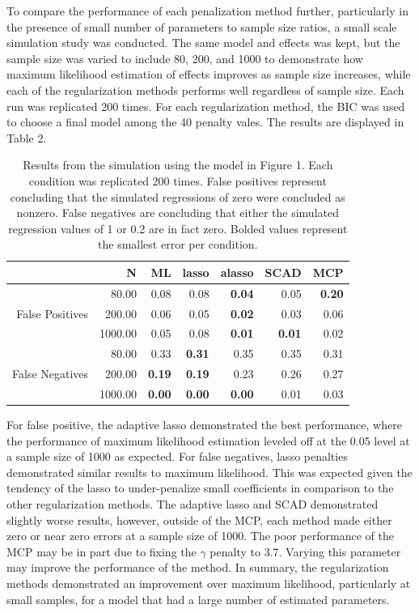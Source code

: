 \documentclass[article]{jss}
\begin{document}
To compare the performance of each penalization method further,
particularly in the presence of small number of parameters to sample
size ratios, a small scale simulation study was conducted. The same
model and effects was kept, but the sample size was varied to include
80, 200, and 1000 to demonstrate how maximum likelihood estimation of
effects improves as sample size increases, while each of the
regularization methods performs well regardless of sample size. Each run
was replicated 200 times. For each regularization method, the BIC was
used to choose a final model among the 40 penalty vales. The results are
displayed in Table 2.

\begin{table}[ht]
\centering
\begin{tabular}{rrrrrrr}
  \hline
 & N & ML & lasso & alasso & SCAD & MCP \\ 
  \hline
 & 80.00 & 0.08 & 0.08 & \textbf{0.04} & 0.05 & \textbf{0.20} \\ 
  False Positives & 200.00 & 0.06 & 0.05 & \textbf{0.02} & 0.03 & 0.06 \\ 
   & 1000.00 & 0.05 & 0.08 & \textbf{0.01} & \textbf{0.01} & 0.02 \\ 
   & 80.00 & 0.33 & \textbf{0.31} & 0.35 & 0.35 & 0.31 \\ 
  False Negatives & 200.00 & \textbf{0.19} & \textbf{0.19} & 0.23 & 0.26 & 0.27 \\ 
   & 1000.00 & \textbf{0.00} & \textbf{0.00} & \textbf{0.00} & 0.01 & 0.03 \\ 
   \hline
\end{tabular}
    \caption{Results from the simulation using the model in Figure 1. Each condition was replicated 200 times. False positives represent concluding that the simulated regressions of zero were concluded as nonzero. False negatives are concluding that either the simulated regression values of 1 or 0.2 are in fact zero. Bolded values represent the smallest error per condition.}
\end{table}

For false positive, the adaptive lasso demonstrated the best
performance, where the performance of maximum likelihood estimation
leveled off at the 0.05 level at a sample size of 1000 as expected. For
false negatives, lasso penalties demonstrated similar results to maximum
likelihood. This was expected given the tendency of the lasso to
under-penalize small coefficients in comparison to the other
regularization methods. The adaptive lasso and SCAD demonstrated
slightly worse results, however, outside of the MCP, each method made
either zero or near zero errors at a sample size of 1000. The poor
performance of the MCP may be in part due to fixing the \(\gamma\)
penalty to 3.7. Varying this parameter may improve the performance of
the method. In summary, the regularization methods demonstrated an
improvement over maximum likelihood, particularly at small samples, for
a model that had a large number of estimated parameters.
\end{document}
